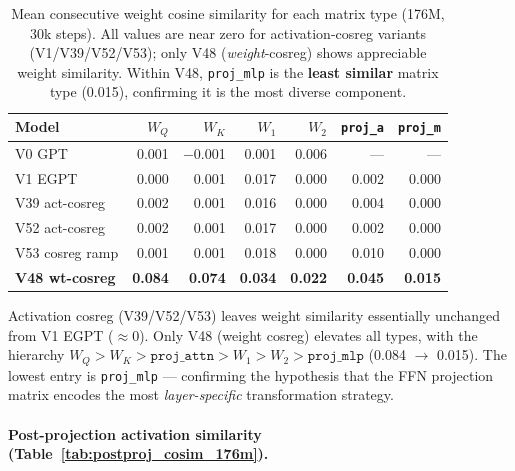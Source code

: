 \begin{table}[ht]
\centering
\caption{%
  Mean consecutive weight cosine similarity for each matrix type (176M, 30k steps).
  All values are near zero for activation-cosreg variants (V1/V39/V52/V53);
  only V48 (\emph{weight}-cosreg) shows appreciable weight similarity.
  Within V48, \texttt{proj\_mlp} is the \textbf{least similar} matrix type
  (0.015), confirming it is the most diverse component.
}
\label{tab:weight_cosim_176m}
\small
\begin{tabular}{lrrrrrr}
\toprule
\textbf{Model} & $W_Q$ & $W_K$ & $W_1$ & $W_2$ & \texttt{proj\_a} & \texttt{proj\_m} \\
\midrule
V0  GPT         & 0.001 & $-$0.001 & 0.001 & 0.006 & ---   & ---   \\
V1  EGPT        & 0.000 &  0.001   & 0.017 & 0.000 & 0.002 & 0.000 \\
V39 act-cosreg  & 0.002 &  0.001   & 0.016 & 0.000 & 0.004 & 0.000 \\
V52 act-cosreg  & 0.002 &  0.001   & 0.017 & 0.000 & 0.002 & 0.000 \\
V53 cosreg ramp & 0.001 &  0.001   & 0.018 & 0.000 & 0.010 & 0.000 \\
\textbf{V48 wt-cosreg}  & \textbf{0.084} & \textbf{0.074} & \textbf{0.034} & \textbf{0.022} & \textbf{0.045} & \textbf{0.015} \\
\bottomrule
\end{tabular}
\end{table}

Activation cosreg (V39/V52/V53) leaves weight similarity essentially unchanged
from V1 EGPT (${\approx}0$).  Only V48 (weight cosreg) elevates all types, with
the hierarchy $W_Q > W_K > \texttt{proj\_attn} > W_1 > W_2 > \texttt{proj\_mlp}$
(0.084 $\to$ 0.015).  The lowest entry is \texttt{proj\_mlp} — confirming the
hypothesis that the FFN projection matrix encodes the most
\emph{layer-specific} transformation strategy.

\paragraph{Post-projection activation similarity (Table~\ref{tab:postproj_cosim_176m}).}

